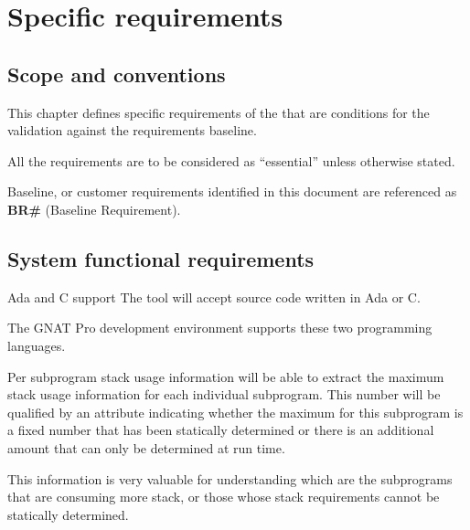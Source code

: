 \chapter{Specific requirements}\label{ch:requirements}

\section{Scope and conventions}

This chapter defines specific requirements of the \ssat{} that are
conditions for the validation against the requirements baseline.

All the requirements are to be considered as ``essential'' unless
otherwise stated.

Baseline, or customer requirements identified in this document are
referenced as \textbf{BR\#} (Baseline Requirement).

\section{System functional requirements}\label{sc:functional}

\begin{requirement}{Ada and C support}
  The tool will accept source code written in Ada or C.
\end{requirement}

\begin{rationale}
  The GNAT Pro development environment supports these two programming
  languages.
\end{rationale}

\begin{requirement}{Per subprogram stack usage information}
  \ssat{} will be able to extract the maximum stack usage information
  for each individual subprogram. This number will be qualified by an
  attribute indicating whether the maximum for this subprogram is a
  fixed number that has been statically determined or there is an
  additional amount that can only be determined at run time.
\end{requirement}

\begin{rationale}
  This information is very valuable for understanding which are
  the subprograms that are consuming more stack, or those whose stack
  requirements cannot be statically determined.
\end{rationale}

